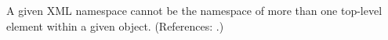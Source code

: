 A given XML namespace cannot be the namespace of more than one top-level
element within a given \Annotation object.  (References: .)

